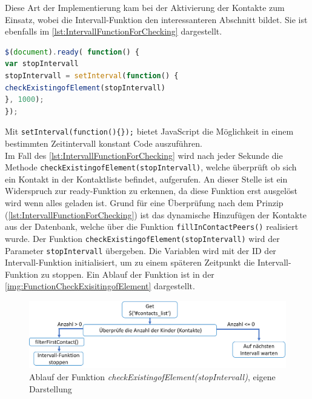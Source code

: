 \documentclass[a4paper,titlepage,halfparskip,12pt]{scrreprt}
\begin{document}
\begin{onehalfspacing}
Diese Art der Implementierung kam bei der Aktivierung der Kontakte zum Einsatz, wobei die Intervall-Funktion den interessanteren Abschnitt bildet. Sie ist ebenfalls im \autoref{lst:IntervallFunctionForChecking} dargestellt.
\begin{lstlisting}[language=Javascript,caption= Ready() Funktion mit der Intervall-Funktion zue Überprüfung der Kontaktliste,label={lst:IntervallFunctionForChecking}]
$(document).ready( function() {
var stopIntervall 
stopIntervall = setInterval(function() {
checkExistingofElement(stopIntervall)
}, 1000);
});
\end{lstlisting}
Mit \texttt{setInterval(function()\{\});} bietet JavaScript die Möglichkeit in einem bestimmten Zeitintervall konstant Code auszuführen.\cite{w3schoolssetInterval}\\Im Fall des \autoref{lst:IntervallFunctionForChecking} wird nach jeder Sekunde die Methode \texttt{checkExistingofElement(stopIntervall)}, welche überprüft ob sich ein Kontakt in der Kontaktliste befindet, aufgerufen. An dieser Stelle ist ein Widerspruch zur ready-Funktion zu erkennen, da diese Funktion erst ausgelöst wird wenn alles geladen ist. Grund für eine Überprüfung nach dem Prinzip (\autoref{lst:IntervallFunctionForChecking}) ist das dynamische Hinzufügen der Kontakte aus der Datenbank, welche über die Funktion \texttt{fillInContactPeers()} realisiert wurde. Der Funktion \texttt{checkExistingofElement(stopIntervall)} wird der Parameter \texttt{stopIntervall} übergeben. Die Variablen wird mit der ID der Intervall-Funktion initialisiert, um zu einem späteren Zeitpunkt die Intervall-Funktion zu stoppen. Ein Ablauf der Funktion ist in der \autoref{img:FunctionCheckExisitingofElement} dargestellt.
\begin{figure}[h]
	\centering
	\includegraphics[scale=0.7]{images/FunctionCheckExisitingofElement}
	\caption{Ablauf der Funktion \textit{checkExistingofElement(stopIntervall)}, eigene Darstellung}
	\label{img:FunctionCheckExisitingofElement}
\end{figure}

\end{onehalfspacing}
\end{document}
